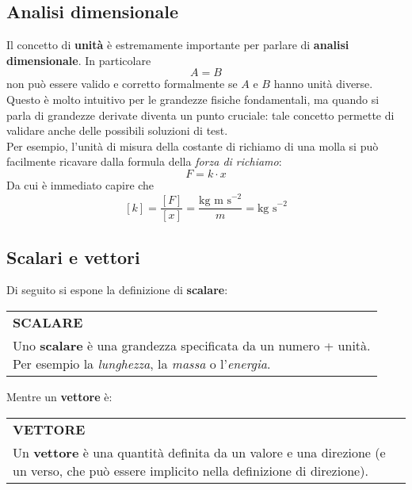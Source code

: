 \documentclass[a4paper]{extarticle}
\renewcommand\arraystretch{}
\begin{document}
\subsection{Analisi dimensionale}
Il concetto di \textbf{unità} è estremamente importante per parlare di \textbf{analisi dimensionale}. In particolare
\[A = B\]
non può essere valido e corretto formalmente se $A$ e $B$ hanno unità diverse. Questo è molto intuitivo per le grandezze fisiche fondamentali, ma quando si parla di grandezze derivate diventa un punto cruciale: tale concetto permette di validare anche delle possibili soluzioni di test.\\
Per esempio, l'unità di misura della costante di richiamo di una molla si può facilmente ricavare dalla formula della \emph{forza di richiamo}:
\[F = k \cdot x\]
Da cui è immediato capire che
\[\left[k\right] = \frac{\left[F\right]}{\left[x\right]} = \frac{\text{kg m s}^{-2}}{m} = \text{kg s}^{-2}\]

\vspace{1em}
\subsection{Scalari e vettori}
Di seguito si espone la definizione di \textbf{scalare}:

\vspace{1em}
\setlength{\tabcolsep}{14pt}
\renewcommand{\arraystretch}{2}
\noindent
\begin{tabularx}{\textwidth}{@{}|P|@{}}
    \hline
    {\textbf{SCALARE}}\\
    \parbox{\linewidth}{Uno \textbf{scalare} è una grandezza specificata da un numero + unità.\\
    Per esempio la \emph{lunghezza}, la \emph{massa} o l'\emph{energia}.
    \vspace{3mm}}\\
    \hline
\end{tabularx}

\vspace{1em}
\noindent
Mentre un \textbf{vettore} è:

\vspace{1em}
\setlength{\tabcolsep}{14pt}
\renewcommand{\arraystretch}{2}
\noindent
\begin{tabularx}{\textwidth}{@{}|P|@{}}
    \hline
    {\textbf{VETTORE}}\\
    \parbox{\linewidth}{Un \textbf{vettore} è  una quantità definita da un valore e una direzione (e un verso, che può essere implicito nella definizione di direzione).
    \vspace{3mm}}\\
    \hline
\end{tabularx}
\end{document}

